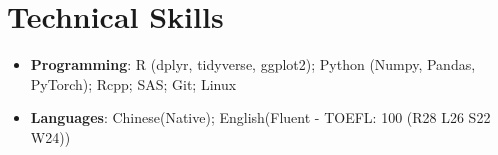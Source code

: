 \documentclass[letterpaper,11pt]{article}
\makeatletter
\newcommand{\resumeItem}[1]{
  \item\small{
    {#1 \vspace{-2pt}}
  }
}
\newcommand{\resumeSubheading}[4]{
  \vspace{-2pt}\item
    \begin{tabular*}{1.0\textwidth}[t]{l@{\extracolsep{\fill}}r}
      \textbf{#1} & \textbf{\small #2} \\
      \textit{\small#3} & \textit{\small #4} \\
    \end{tabular*}\vspace{-7pt}
}
\newcommand{\resumeSubHeadingListStart}{\begin{itemize}[leftmargin=0.0in, label={}]}
\newcommand{\resumeSubHeadingListEnd}{\end{itemize}}
\newcommand{\resumeItemListStart}{\begin{itemize}}
\newcommand{\resumeItemListEnd}{\end{itemize}\vspace{-5pt}}
\makeatother
\begin{document}
%
\section{Technical Skills}
 \begin{itemize}[leftmargin=0.15in, label={}, itemsep=-2pt]
    \small \item
     \textbf{Programming}{: R (dplyr, tidyverse, ggplot2); Python (Numpy, Pandas, PyTorch); Rcpp; SAS; Git; Linux} \\
     \item \textbf{Languages}{: Chinese(Native); English(Fluent - TOEFL: 100 (R28 L26 S22 W24))} \\
    
 \end{itemize}
 \vspace{-10pt}


    
        


    
\end{document}
